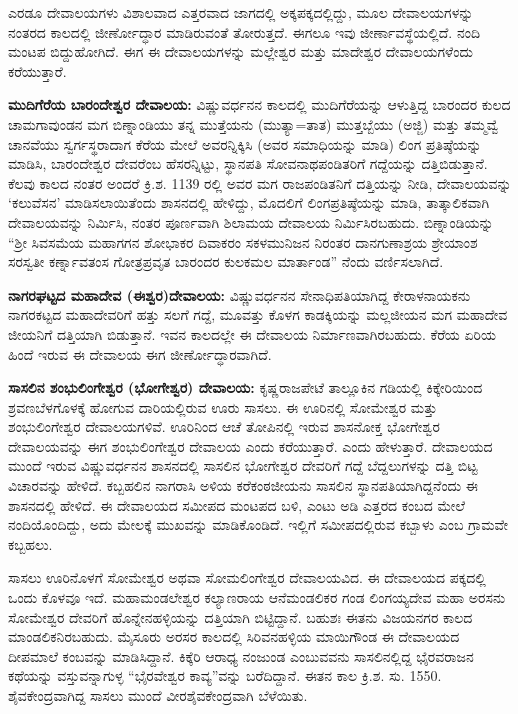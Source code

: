 ಎರಡೂ ದೇವಾಲಯಗಳು ವಿಶಾಲವಾದ ಎತ್ತರವಾದ ಜಾಗದಲ್ಲಿ ಅಕ್ಕಪಕ್ಕದಲ್ಲಿದ್ದು, ಮೂಲ ದೇವಾಲಯಗಳನ್ನು ನಂತರದ ಕಾಲದಲ್ಲಿ ಜೀರ್ಣೋದ್ಧಾರ ಮಾಡಿರುವಂತೆ ತೋರುತ್ತದೆ. ಈಗಲೂ ಇವು ಜೀರ್ಣಾವಸ್ಥೆಯಲ್ಲಿದೆ. ನಂದಿ ಮಂಟಪ ಬಿದ್ದುಹೋಗಿದೆ. ಈಗ ಈ ದೇವಾಲಯಗಳನ್ನು ಮಲ್ಲೇಶ್ವರ ಮತ್ತು ಮಾದೇಶ್ವರ ದೇವಾಲಯಗಳೆಂದು ಕರೆಯುತ್ತಾರೆ.

\textbf{ಮುದಿಗೆರೆಯ ಬಾರಂದೇಶ್ವರ ದೇವಾಲಯ:} ವಿಷ್ಣುವರ್ಧನನ ಕಾಲದಲ್ಲಿ ಮುದಿಗೆರೆಯನ್ನು ಆಳುತ್ತಿದ್ದ ಬಾರಂದರ ಕುಲದ ಚಾಮಗಾವುಂಡನ ಮಗ ಬಿಣ್ನಾಂಡಿಯು ತನ್ನ ಮುತ್ತೆಯನು (ಮುತ್ಯಾ=ತಾತ) ಮುತ್ತಬ್ಬೆಯು (ಅಜ್ಜಿ) ಮತ್ತು ತಮ್ಮವ್ವೆ ಚಾನವೆಯು ಸ್ವರ್ಗಸ್ಥರಾದಾಗ ಕೆರೆಯ ಮೇಲೆ ಅವರನ್ನಿಕ್ಕಿಸಿ (ಅವರ ಸಮಾಧಿಯನ್ನು ಮಾಡಿ) ಲಿಂಗ ಪ್ರತಿಷ್ಠೆಯನ್ನು ಮಾಡಿಸಿ, ಬಾರಂದೇಶ್ವರ ದೇವರೆಂಬ ಹೆಸರನ್ನಿಟ್ಟು, ಸ್ಥಾನಪತಿ ಸೋವನಾಥಪಂಡಿತರಿಗೆ ಗದ್ದೆಯನ್ನು ದತ್ತಿಬಿಡುತ್ತಾನೆ. ಕೆಲವು ಕಾಲದ ನಂತರ ಅಂದರೆ ಕ್ರಿ.ಶ. 1139 ರಲ್ಲಿ ಅವರ ಮಗ ರಾಜಪಂಡಿತನಿಗೆ ದತ್ತಿಯನ್ನು ನೀಡಿ, ದೇವಾಲಯವನ್ನು ‘ಕಲುವೆಸನ’ ಮಾಡಿಸಲಾಯಿತೆಂದು ಶಾಸನದಲ್ಲಿ ಹೇಳಿದ್ದು, ಮೊದಲಿಗೆ ಲಿಂಗಪ್ರತಿಷ್ಠೆಯನ್ನು ಮಾಡಿ, ತಾತ್ಕಾಲಿಕವಾಗಿ ದೇವಾಲಯವನ್ನು ನಿರ್ಮಿಸಿ, ನಂತರ ಪೂರ್ಣವಾಗಿ ಶಿಲಾಮಯ ದೇವಾಲಯ ನಿರ್ಮಿಸಿರಬಹುದು. ಬಿಣ್ನಾಂಡಿಯನ್ನು “ಶ‍್ರೀ ಸಿವಸಮೆಯ ಮಹಾಗಗನ ಶೋಭಾಕರ ದಿವಾಕರಂ ಸಕಳಮುನಿಜನ ನಿರಂತರ ದಾನಗುಣಾಶ್ರಯ ಶ್ರೇಯಾಂಶ ಸರಸ್ವತೀ ಕರ್ಣ್ನಾವತಂಸ ಗೋತ್ರಪ್ರವೃತ ಬಾರಂದರ ಕುಲಕಮಲ ಮಾರ್ತಾಂಡ” ನೆಂದು ವರ್ಣಿಸಲಾಗಿದೆ.

\textbf{ನಾಗರಘಟ್ಟದ ಮಹಾದೇವ (ಈಶ್ವರ)ದೇವಾಲಯ:} ವಿಷ್ಣುವರ್ಧನನ ಸೇನಾಧಿಪತಿಯಾಗಿದ್ದ ಕೇರಾಳನಾಯಕನು ನಾಗರಕಟ್ಟದ ಮಹಾದೇವರಿಗೆ ಹತ್ತು ಸಲಗೆ ಗದ್ದೆ, ಮೂವತ್ತು ಕೊಳಗ ಕಾಡಕ್ಕಿಯನ್ನು ಮಲ್ಲಜೀಯನ ಮಗ ಮಹಾದೇವ ಜೀಯನಿಗೆ ದತ್ತಿಯಾಗಿ ಬಿಡುತ್ತಾನೆ. ಇವನ ಕಾಲದಲ್ಲೇ ಈ ದೇವಾಲಯ ನಿರ್ಮಾಣವಾಗಿರಬಹುದು. ಕೆರೆಯ ಏರಿಯ ಹಿಂದೆ ಇರುವ ಈ ದೇವಾಲಯ ಈಗ ಜೀರ್ಣೋದ್ಧಾರವಾಗಿದೆ.

\textbf{ಸಾಸಲಿನ ಶಂಭುಲಿಂಗೇಶ್ವರ (ಭೋಗೇಶ್ವರ) ದೇವಾಲಯ:} ಕೃಷ್ಣರಾಜಪೇಟೆ ತಾಲ್ಲೂಕಿನ ಗಡಿಯಲ್ಲಿ ಕಿಕ್ಕೇರಿಯಿಂದ ಶ್ರವಣಬೆಳಗೊಳಕ್ಕೆ ಹೋಗುವ ದಾರಿಯಲ್ಲಿರುವ ಊರು ಸಾಸಲು. ಈ ಊರಿನಲ್ಲಿ ಸೋಮೇಶ್ವರ ಮತ್ತು ಶಂಭುಲಿಂಗೇಶ್ವರ ದೇವಾಲಯಗಳಿವೆ. ಊರಿನಿಂದ ಆಚೆ ತೋಪಿನಲ್ಲಿ ಇರುವ ಶಾಸನೋಕ್ತ ಭೋಗೇಶ್ವರ ದೇವಾಲಯವನ್ನು ಈಗ ಶಂಭುಲಿಂಗೇಶ್ವರ ದೇವಾಲಯ ಎಂದು ಕರೆಯುತ್ತಾರೆ. ಎಂದು ಹೇಳುತ್ತಾರೆ. ದೇವಾಲಯದ ಮುಂದೆ ಇರುವ ವಿಷ್ಣುವರ್ಧನನ ಶಾಸನದಲ್ಲಿ ಸಾಸಲಿನ ಭೋಗೇಶ್ವರ ದೇವರಿಗೆ ಗದ್ದೆ ಬೆದ್ದಲುಗಳನ್ನು ದತ್ತಿ ಬಿಟ್ಟ ವಿಚಾರವನ್ನು ಹೇಳಿದೆ. ಕಬ್ಬಹಲಿನ ನಾಗರಾಸಿ ಅಳಿಯ ಕರೆಕಂಠಜೀಯನು ಸಾಸಲಿನ ಸ್ಥಾನಪತಿಯಾಗಿದ್ದನೆಂದು ಈ ಶಾಸನದಲ್ಲಿ ಹೇಳಿದೆ. ಈ ದೇವಾಲಯದ ಸಮೀಪದ ಮಂಟಪದ ಬಳಿ, ಎಂಟು ಅಡಿ ಎತ್ತರದ ಕಂಬದ ಮೇಲೆ ನಂದಿಯೊಂದಿದ್ದು, ಅದು ಮೇಲಕ್ಕೆ ಮುಖವನ್ನು ಮಾಡಿಕೊಂಡಿದೆ. ಇಲ್ಲಿಗೆ ಸಮೀಪದಲ್ಲಿರುವ ಕಬ್ಬಾಳು ಎಂಬ ಗ್ರಾಮವೇ ಕಬ್ಬಹಲು. 

ಸಾಸಲು ಊರಿನೊಳಗೆ ಸೋಮೇಶ್ವರ ಅಥವಾ ಸೋಮಲಿಂಗೇಶ್ವರ ದೇವಾಲಯವಿದ. ಈ ದೇವಾಲಯದ ಪಕ್ಕದಲ್ಲಿ ಒಂದು ಕೊಳವೂ ಇದೆ. ಮಹಾಮಂಡಲೇಶ್ವರ ಕಲ್ಯಾಣರಾಯ ಆನೆಮಂಡಲಿಕರ ಗಂಡ ಲಿಂಗಯ್ಯದೇವ ಮಹಾ ಅರಸನು ಸೋಮೇಶ್ವರ ದೇವರಿಗೆ ಹೊನ್ನೇನಹಳ್ಳಿಯನ್ನು ದತ್ತಿಯಾಗಿ ಬಿಟ್ಟಿದ್ದಾನೆ. ಬಹುಶಃ ಈತನು ವಿಜಯನಗರ ಕಾಲದ ಮಾಂಡಲಿಕನಿರಬಹುದು. ಮೈಸೂರು ಅರಸರ ಕಾಲದಲ್ಲಿ ಸಿರಿವನಹಳ್ಳಿಯ ಮಾಯಿಗೌಂಡ ಈ ದೇವಾಲಯದ ದೀಪಮಾಲೆ ಕಂಬವನ್ನು ಮಾಡಿಸಿದ್ದಾನೆ. ಕಿಕ್ಕೆರಿ ಆರಾಧ್ಯ ನಂಜುಂಡ ಎಂಬುವವನು ಸಾಸಲಿನಲ್ಲಿದ್ದ ಭೈರವರಾಜನ ಕಥೆಯನ್ನು ವಸ್ತುವನ್ನಾಗುಳ್ಳ “ಭೈರವೇಶ್ವರ ಕಾವ್ಯ”ವನ್ನು ಬರೆದಿದ್ದಾನೆ. ಈತನ ಕಾಲ ಕ್ರಿ.ಶ. ಸು. 1550. ಶೈವಕೇಂದ್ರವಾಗಿದ್ದ ಸಾಸಲು ಮುಂದೆ ವೀರಶೈವಕೇಂದ್ರವಾಗಿ ಬೆಳೆಯಿತು.

